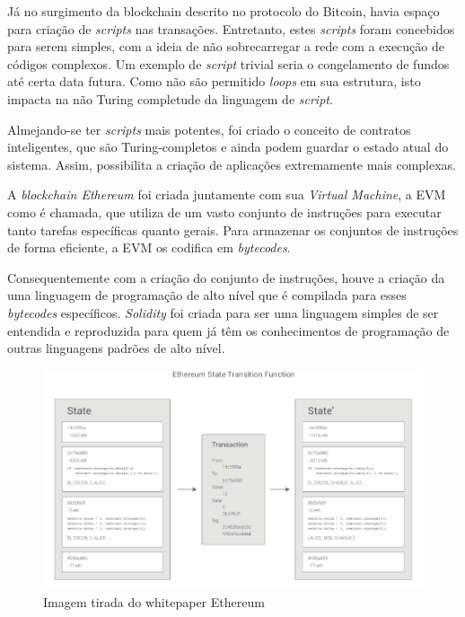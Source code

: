 \documentclass{ufsctex/ufsctex}
\begin{document}
Já no surgimento da blockchain descrito no protocolo do Bitcoin, havia espaço
para criação de \textit{scripts} nas transações. Entretanto, estes
\textit{scripts} foram concebidos para serem simples, com a ideia de não
sobrecarregar a rede com a execução de códigos complexos. Um exemplo de
\textit{script} trivial seria o congelamento de fundos até certa data futura.
Como não são  permitido \textit{loops} em sua estrutura, isto impacta na não
Turing completude da linguagem de \textit{script}.\cite{nakamoto2012bitcoin}

Almejando-se ter \textit{scripts} mais potentes, foi criado o conceito de
contratos inteligentes, que são Turing-completos e ainda podem guardar o estado
atual do sistema.  Assim, possibilita a criação de aplicações extremamente mais
complexas.\cite{ethereum}

A \textit{blockchain Ethereum} foi criada juntamente com sua \textit{Virtual
Machine}, a EVM como é chamada, que
utiliza de um vasto conjunto de instruções para executar tanto tarefas
específicas quanto gerais. Para armazenar os conjuntos de instruções de forma
eficiente, a EVM os codifica em \textit{bytecodes}.\cite{wood2014yellow}

Consequentemente com a criação do conjunto de instruções, houve a criação da uma
linguagem de programação de alto nível que é compilada para esses
\textit{bytecodes} específicos.  \textit{Solidity} foi criada para ser uma
linguagem simples de ser entendida e reproduzida para quem já têm os
conhecimentos de programação de outras linguagens padrões de alto nível.
\cite{solidity}

\begin{figure}[h]
	\centering
	\includegraphics[scale=0.3]{ethereum}
	\caption{Imagem tirada do whitepaper Ethereum}
	\label{fig:ethereum}
\end{figure}
\end{document}

